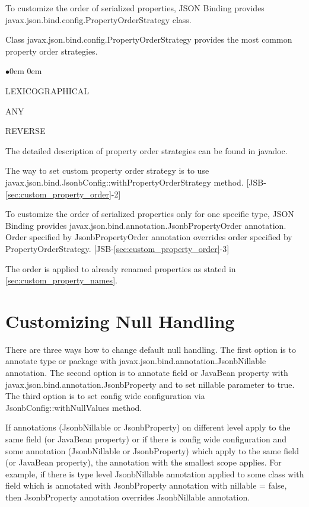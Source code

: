 To customize the order of serialized properties, JSON Binding provides javax.json.bind.config.PropertyOrderStrategy class.

Class javax.json.bind.config.PropertyOrderStrategy provides the most common property order strategies.

\begin{list}{$\bullet$}{\parsep 0em  0em}
\item LEXICOGRAPHICAL
\item ANY
\item REVERSE
\end{list}

The detailed description of property order strategies can be found in javadoc.

The way to set custom property order strategy is to use javax.json.bind.JsonbConfig::withPropertyOrderStrategy method. [JSB-\ref{sec:custom_property_order}-2]

To customize the order of serialized properties only for one specific type, JSON Binding provides javax.json.bind.annotation.JsonbPropertyOrder annotation. Order specified by JsonbPropertyOrder annotation overrides order specified by PropertyOrderStrategy. [JSB-\ref{sec:custom_property_order}-3]

The order is applied to already renamed properties as stated in \ref{sec:custom_property_names}.

\section{Customizing Null Handling}
\label{sec:custom_null_handling}

There are three ways how to change default null handling. The first option is to annotate type or package with javax.json.bind.annotation.JsonbNillable annotation. The second option is to annotate field or JavaBean property with javax.json.bind.annotation.JsonbProperty and to set nillable parameter to true. The third option is to set config wide configuration via JsonbConfig::withNullValues method.

If annotations (JsonbNillable or JsonbProperty) on different level apply to the same field (or JavaBean property) or if there is config wide configuration and some annotation (JsonbNillable or JsonbProperty) which apply to the same field (or JavaBean property), the annotation with the smallest scope applies. For example, if there is type level JsonbNillable annotation applied to some class with field which is annotated with JsonbProperty annotation with nillable = false, then JsonbProperty annotation overrides JsonbNillable annotation.

